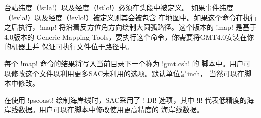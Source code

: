 台站纬度（!stla!）以及经度（!stlo!）必须在头段中被定义。
如果事件纬度（!evla!）以及经度（!evlo!）被定义则其会被包含
在地图中。如果这个命令在执行  之后执行，!map!
将沿着反方位角方向绘制大圆弧路径。这个版本的 !map! 是基于4.0版本的
Generic Mapping Tools，要执行这个命令，你需要将GMT4.0安装在你的机器上并
保证可执行文件位于路径中。

每个 !map! 命令的结果将写入当前目录下一个称为 !gmt.csh! 的
脚本中。用户可以修改这个文件以利用更多SAC未利用的选项。默认单位是inch，
当然可以在脚本中修改。

在使用 !pscoast! 绘制海岸线时，SAC采用了 !-Dl! 选项，其中
!l! 代表低精度的海岸线数据。用户可以在脚本中修改使用更高精度的
海岸线数据。
